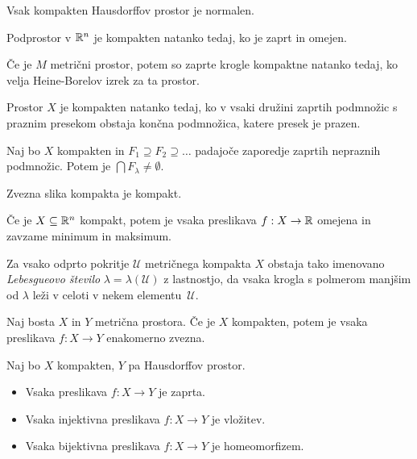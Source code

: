 \begin{posledica}
    Vsak kompakten Hausdorffov prostor je normalen.
\end{posledica}

\begin{izrek}
    Podprostor v $\mathbb{R}^n$ je kompakten natanko tedaj, ko je zaprt in omejen.
\end{izrek}

\begin{opomba}
    Če je \(M\) metrični prostor, potem so zaprte krogle kompaktne natanko tedaj, ko velja Heine-Borelov izrek za ta prostor.
\end{opomba}

\begin{trditev}
    Prostor $X$ je kompakten natanko tedaj, ko v vsaki družini zaprtih podmnožic s praznim presekom obstaja končna podmnožica, katere presek je prazen.
\end{trditev}

\begin{izrek}
    Naj bo $X$ kompakten in $F_1 \supseteq F_2 \supseteq \ldots$ padajoče zaporedje zaprtih nepraznih podmnožic. Potem je $\bigcap F_\lambda \neq \emptyset$.
\end{izrek}

\begin{izrek}
    Zvezna slika kompakta je kompakt.
\end{izrek}

\begin{posledica}
    Če je $X \subseteq \mathbb{R}^n$ kompakt, potem je vsaka preslikava $f: X \to \mathbb{R}$ omejena in zavzame minimum in maksimum.
\end{posledica}

\begin{izrek}
    Za vsako odprto pokritje \(\mathcal{U}\) metričnega kompakta $X$ obstaja tako imenovano \emph{Lebesgueovo število} $\lambda = \lambda (\mathcal{U})$ z lastnostjo, da vsaka krogla s polmerom manjšim od $\lambda$ leži v celoti v nekem elementu~$\mathcal{U}$.
\end{izrek}

\begin{izrek}
    Naj bosta $X$ in $Y$ metrična prostora. Če je $X$ kompakten, potem je vsaka preslikava $f: X \to Y$ enakomerno zvezna.
\end{izrek}

\begin{izrek}
    Naj bo $X$ kompakten, $Y$ pa Hausdorffov prostor.
    \begin{itemize}
        \item Vsaka preslikava $f: X \to Y$ je zaprta.
        \item Vsaka injektivna preslikava \(f:  X \to Y\) je vložitev.
        \item Vsaka bijektivna preslikava \(f:  X \to Y\) je homeomorfizem.
    \end{itemize}
\end{izrek}

